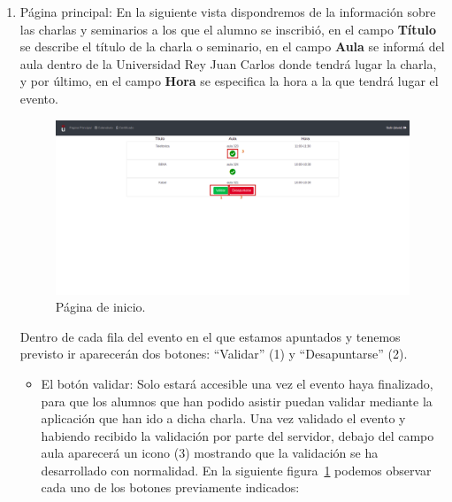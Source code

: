 \documentclass[a4paper, 12pt]{book}
\begin{document}
\begin{enumerate}
  \item Página principal: En la siguiente vista dispondremos de la información sobre las charlas y seminarios a los que el alumno se inscribió, en el campo \textbf{Título} se describe el título de la charla o seminario, en el campo \textbf{Aula} se informá del aula dentro de la Universidad Rey Juan Carlos donde tendrá lugar la charla, y por último, en el campo \textbf{Hora} se especifica la hora a la que tendrá lugar el evento.
  
    \begin{figure}[h!]
  	\centering
  	\includegraphics[width=13cm, keepaspectratio]{img/inicio.png}
  	\caption{Página de inicio.}\label{fig:inicio}
	\end{figure}
	
  Dentro de cada fila del evento en el que estamos apuntados y tenemos previsto ir aparecerán dos botones: ``Validar'' (1) y ``Desapuntarse'' (2). 
\begin{itemize}
  \item El botón validar: Solo estará accesible una vez el evento haya finalizado, para que los alumnos que han podido asistir puedan validar mediante la aplicación que han ido a dicha charla. Una vez validado el evento y habiendo recibido la validación por parte del servidor, debajo del campo aula aparecerá un icono (3) mostrando que la validación se ha desarrollado con normalidad.
  En la siguiente figura~\ref{fig:inicio} podemos observar cada uno de los botones previamente indicados:



\end{itemize}
\end{enumerate}
\end{document}
